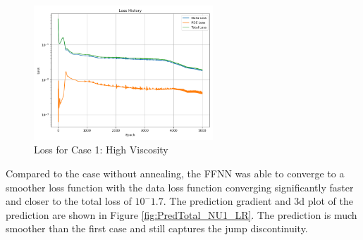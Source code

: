 \documentclass[11pt]{article}
\begin{document}
\begin{figure}[h]
    \centering
    \includegraphics[width=0.6\textwidth]{1D_Loss_NU1_Annealing.png}
    \caption{Loss for Case 1: High Viscosity}
    \label{fig:Loss_NU1_LR}
\end{figure}

Compared to the case without annealing, the FFNN was able to converge to a smoother loss function with the data loss function converging significantly faster and closer to the total loss of $10^-1.7$. The prediction gradient and 3d plot of the prediction are shown in Figure \ref{fig:PredTotal_NU1_LR}. The prediction is much smoother than the first case and still captures the jump discontinuity.

\pagebreak
\end{document}

